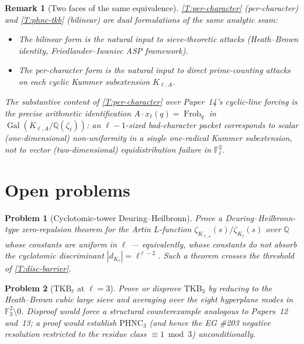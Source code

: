 \documentclass[11pt]{article}
\newtheorem{remark}{Remark}
\newtheorem{problem}{Problem}
\newcommand{\Q}{\mathbb Q}
\newcommand{\F}{\mathbb F}
\newcommand{\1}{\mathbf 1}
\begin{document}
\begin{remark}[Two faces of the same equivalence]\label{R:two-faces}
\cref{T:per-character} (per-character) and \cref{T:phnc-tkb} (bilinear) are dual formulations of the same analytic seam:
\begin{itemize}[leftmargin=2em]
\item The bilinear form is the natural input to sieve-theoretic attacks (Heath--Brown identity, Friedlander--Iwaniec ASP framework).
\item The per-character form is the natural input to direct prime-counting attacks on each cyclic Kummer subextension \(K_{\ell,A}\).
\end{itemize}
The substantive content of \cref{T:per-character} over Paper~14's cyclic-line forcing is the precise arithmetic identification \(A\cdot x_\ell(q)=\operatorname{Frob}_q\) in \(\operatorname{Gal}(K_{\ell,A}/\Q(\zeta_\ell))\): an \(\ell-1\)-sized bad-character packet corresponds to \emph{scalar} (one-dimensional) non-uniformity in a single one-radical Kummer subextension, not to \emph{vector} (two-dimensional) equidistribution failure in \(\F_\ell^2\).
\end{remark}

\section{Open problems}\label{S:open}

\begin{problem}[Cyclotomic-tower Deuring--Heilbronn]\label{Pr:DH-tower}
Prove a Deuring--Heilbronn-type zero-repulsion theorem for the Artin \(L\)-function
\(\zeta_{K_{\ell,\star}}(s)/\zeta_{K_\ell}(s)\) over \(\Q\) whose constants are uniform in \(\ell\) — equivalently, whose constants do not absorb the cyclotomic discriminant \(|d_{K_\ell}|=\ell^{\ell-2}\).  Such a theorem crosses the threshold of \cref{T:disc-barrier}.
\end{problem}

\begin{problem}[\(\mathrm{TKB}_\ell\) at \(\ell=3\)]\label{Pr:TKB-3}
Prove or disprove \(\mathrm{TKB}_3\) by reducing to the Heath--Brown cubic large sieve and averaging over the eight hyperplane modes in \(\F_3^2\setminus 0\).  Disproof would force a structural counterexample analogous to Papers~12 and~13; a proof would establish \(\mathrm{PHNC}_3\) (and hence the EG \#203 negative resolution restricted to the residue class \(\equiv 1\bmod 3\)) unconditionally.
\end{problem}
\end{document}
